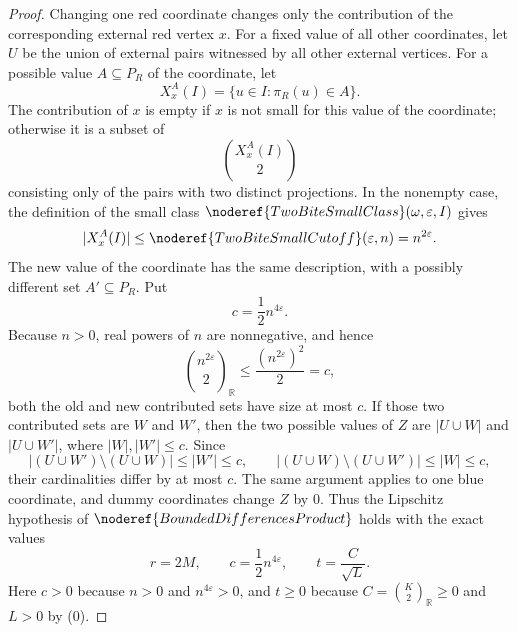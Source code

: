 \begin{proof}
Changing one red coordinate changes only the contribution of the corresponding
external red vertex \(x\).  For a fixed value of all other coordinates, let
\(U\) be the union of external pairs witnessed by all other external vertices.
For a possible value \(A\subseteq P_R\) of the coordinate, let
\[
X_x^A(I)=\{u\in I:\pi_R(u)\in A\}.
\]
The contribution of \(x\) is empty if \(x\) is not small for this value of the
coordinate; otherwise it is a subset of
\[
\binom{X_x^A(I)}2
\]
consisting only of the pairs with two distinct projections.  In the nonempty
case, the definition of the small class
\(\noderef{TwoBiteSmallClass}(\omega,\varepsilon,I)\) gives
\[
|X_x^A(I)|\le\noderef{TwoBiteSmallCutoff}(\varepsilon,n)=n^{2\varepsilon}.
\]
The new value of the coordinate has the same description, with a possibly
different set \(A'\subseteq P_R\).  Put
\[
c=\frac12 n^{4\varepsilon}. \tag{15}
\]
Because \(n>0\), real powers of \(n\) are nonnegative, and hence
\[
\binom{n^{2\varepsilon}}2_{\mathbb R}
\le \frac{(n^{2\varepsilon})^2}{2}
=c,
\]
both the old and new contributed sets have size at most \(c\).  If those two
contributed sets are \(W\) and \(W'\), then the two possible values of \(Z\)
are \(|U\cup W|\) and \(|U\cup W'|\), where \(|W|,|W'|\le c\).  Since
\[
|(U\cup W')\setminus(U\cup W)|\le |W'|\le c,\qquad
|(U\cup W)\setminus(U\cup W')|\le |W|\le c,
\]
their cardinalities differ by at most \(c\).  The same argument applies to one
blue coordinate, and dummy coordinates change \(Z\) by \(0\).  Thus the
Lipschitz hypothesis of \(\noderef{BoundedDifferencesProduct}\) holds with
the exact values
\[
r=2M,\qquad c=\frac12 n^{4\varepsilon},\qquad t=\frac{C}{\sqrt L}.
\]
Here \(c>0\) because \(n>0\) and \(n^{4\varepsilon}>0\), and
\(t\ge0\) because \(C=\binom{K}{2}_{\mathbb R}\ge0\) and \(L>0\) by (0).


\end{proof}
